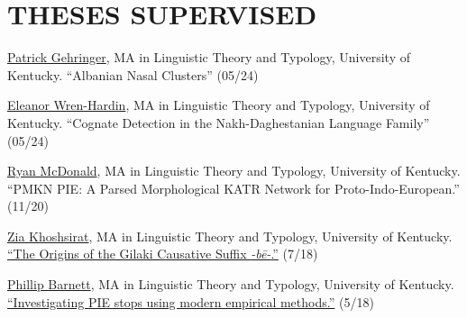 \documentclass[paper=letter,fontsize=11pt]{scrartcl} %
\newcommand{\NewPart}[2]{\section*{\uppercase{#1} #2}}
\newcommand{\TalkEntry}[4]{
		\noindent #1, #2, #3 #4}
\newcommand{\ThesisEntry}[5]{
		\noindent #1 -- #2 #3 ``#4" \textit{#5}}
\begin{document}







\NewPart{Theses Supervised}{}
\begin{etaremune}
\item
\href{https://linguistics.as.uky.edu/users/rmc257}{Patrick Gehringer}, MA in Linguistic Theory and Typology, University of Kentucky. ``Albanian Nasal Clusters'' (05/24)
\item \href{https://linguistics.as.uky.edu/users/rmc257}{Eleanor Wren-Hardin}, MA in Linguistic Theory and Typology, University of Kentucky. ``Cognate Detection in the Nakh-Daghestanian Language Family'' (05/24)
\item \href{https://linguistics.as.uky.edu/users/rmc257}{Ryan McDonald}, MA in Linguistic Theory and Typology, University of Kentucky. ``PMKN PIE: A Parsed Morphological KATR Network for Proto-Indo-European.'' (11/20)
\item \href{https://anthro.ucla.edu/grads/zia-khoshsirat}{Zia Khoshsirat}, MA in Linguistic Theory and Typology, University of Kentucky. {\href{https://uknowledge.uky.edu/ltt_etds/30/}{``The Origins of the Gilaki Causative Suffix \textit{-b\={e}-}.''}} (7/18)
\item \href{https://linguistics.ucla.edu/person/phillip-barnett/}{Phillip Barnett}, MA in Linguistic Theory and Typology, University of Kentucky. {\href{https://uknowledge.uky.edu/ltt_etds/28/}{``Investigating PIE stops using modern empirical methods.''}} (5/18)

\end{etaremune}
\end{document}
